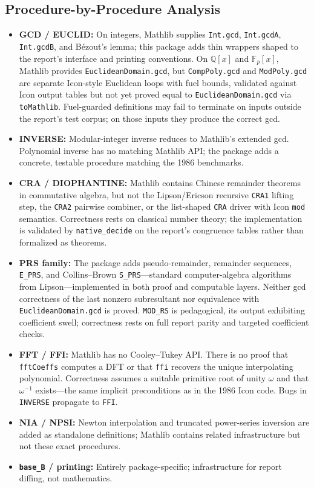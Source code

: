 \documentclass[11pt,a4paper]{article}
\begin{document}
\subsection{Procedure-by-Procedure Analysis}
\begin{itemize}
    \item \textbf{GCD / EUCLID:} On integers, Mathlib supplies \texttt{Int.gcd}, \texttt{Int.gcdA}, \texttt{Int.gcdB}, and Bézout's lemma; this package adds thin wrappers shaped to the report's interface and printing conventions. On $\mathbb{Q}[x]$ and $\mathbb{F}_p[x]$, Mathlib provides \texttt{EuclideanDomain.gcd}, but \texttt{CompPoly.gcd} and \texttt{ModPoly.gcd} are separate Icon-style Euclidean loops with fuel bounds, validated against Icon output tables but not yet proved equal to \texttt{EuclideanDomain.gcd} via \texttt{toMathlib}. Fuel-guarded definitions may fail to terminate on inputs outside the report's test corpus; on those inputs they produce the correct gcd.
    \item \textbf{INVERSE:} Modular-integer inverse reduces to Mathlib's extended gcd. Polynomial inverse has no matching Mathlib API; the package adds a concrete, testable procedure matching the 1986 benchmarks.
    \item \textbf{CRA / DIOPHANTINE:} Mathlib contains Chinese remainder theorems in commutative algebra, but not the Lipson/Ericson recursive \texttt{CRA1} lifting step, the \texttt{CRA2} pairwise combiner, or the list-shaped \texttt{CRA} driver with Icon \texttt{mod} semantics. Correctness rests on classical number theory; the implementation is validated by \texttt{native\_decide} on the report's congruence tables rather than formalized as theorems.
    \item \textbf{PRS family:} The package adds pseudo-remainder, remainder sequences, \texttt{E\_PRS}, and Collins–Brown \texttt{S\_PRS}---standard computer-algebra algorithms from Lipson---implemented in both proof and computable layers. Neither gcd correctness of the last nonzero subresultant nor equivalence with \texttt{EuclideanDomain.gcd} is proved. \texttt{MOD\_RS} is pedagogical, its output exhibiting coefficient swell; correctness rests on full report parity and targeted coefficient checks.
    \item \textbf{FFT / FFI:} Mathlib has no Cooley–Tukey API. There is no proof that \texttt{fftCoeffs} computes a DFT or that \texttt{ffi} recovers the unique interpolating polynomial. Correctness assumes a suitable primitive root of unity $\omega$ and that $\omega^{-1}$ exists---the same implicit preconditions as in the 1986 Icon code. Bugs in \texttt{INVERSE} propagate to \texttt{FFI}.
    \item \textbf{NIA / NPSI:} Newton interpolation and truncated power-series inversion are added as standalone definitions; Mathlib contains related infrastructure but not these exact procedures.
    \item \textbf{\texttt{base\_B} / printing:} Entirely package-specific; infrastructure for report diffing, not mathematics.
\end{itemize}
\end{document}
